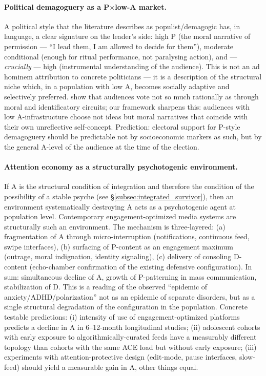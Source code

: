 \paragraph{Political demagoguery as a P$\times$low-A market.} A political style that the literature describes as populist/demagogic has, in \DEIC{} language, a clear signature on the leader's side: high P (the moral narrative of permission --- ``I lead them, I am allowed to decide for them''), moderate conditional \EAF{} (enough for ritual performance, not paralysing action), and --- \emph{crucially} --- high \Ecog{} (instrumental understanding of the audience). This is not an ad hominem attribution to concrete politicians --- it is a description of the structural niche which, in a population with low A, becomes socially adaptive and selectively preferred. \citet{westen2007, haidt2012} show that audiences vote not so much rationally as through moral and identificatory circuits; our framework sharpens this: audiences with low A-infrastructure choose not ideas but moral narratives that coincide with their own unreflective self-concept. Prediction: electoral support for P-style demagoguery should be predictable not by socioeconomic markers as such, but by the general A-level of the audience at the time of the election.

\paragraph{Attention economy as a structurally psychotogenic environment.} If A is the structural condition of integration and therefore the condition of the possibility of a stable psyche (see §\ref{subsec:integrated_survivor}), then an environment systematically destroying A acts as a psychotogenic agent at population level. Contemporary engagement-optimized media systems are structurally such an environment. The mechanism is three-layered: (a) fragmentation of A through micro-interruption (notifications, continuous feed, swipe interfaces), (b) surfacing of P-content as an engagement maximum (outrage, moral indignation, identity signaling), (c) delivery of consoling D-content (echo-chamber confirmation of the existing defensive configuration). In sum: simultaneous decline of A, growth of P-patterning in mass communication, stabilization of D. This is a reading of the observed ``epidemic of anxiety/ADHD/polarization'' not as an epidemic of separate disorders, but as a single structural degradation of the \DEIC{} configuration in the population. Concrete testable predictions: (i) intensity of use of engagement-optimized platforms predicts a decline in A in 6--12-month longitudinal studies; (ii) adolescent cohorts with early exposure to algorithmically-curated feeds have a measurably different \DEIC{} topology than cohorts with the same ACE load but without early exposure; (iii) experiments with attention-protective design (edit-mode, pause interfaces, slow-feed) should yield a measurable gain in A, other things equal.

